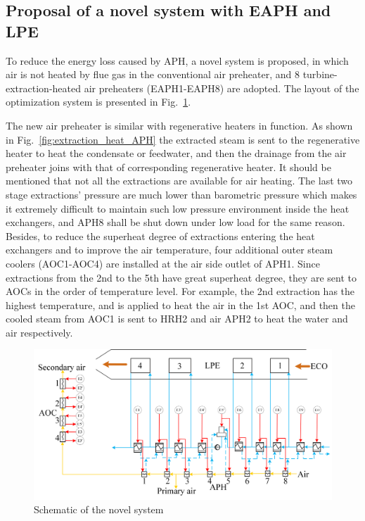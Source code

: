 \documentclass[preprint,12pt]{elsarticle}
\begin{document}
\subsection{Proposal of a novel system with EAPH and LPE}
\label{sub2:prop novel sys}

To reduce the energy loss caused by APH, a novel system is proposed, in which air is not heated by flue gas in the conventional air preheater, and 8 turbine-extraction-heated air preheaters (EAPH1-EAPH8) are adopted.
The  layout of the optimization system is presented in Fig.~\ref{fig:novel_system}.

The new air preheater is similar with regenerative heaters in function.
As shown in Fig.~\ref{fig:extraction_heat_APH} the extracted steam is sent to the regenerative heater to heat the condensate or feedwater, and then the drainage from the air preheater joins with that of corresponding regenerative heater.
It should be mentioned that not all the extractions are available for air heating.
The last two stage extractions' pressure are much lower than barometric pressure which makes it extremely difficult to maintain such low pressure environment inside the heat exchangers, and APH8 shall be shut down under low load for the same reason.
Besides, to reduce the superheat degree of extractions entering the heat exchangers and to improve the air temperature, four additional outer steam coolers (AOC1-AOC4) are installed at the air side outlet of APH1.
Since extractions from the 2nd to the 5th have great superheat degree, they are sent to AOCs in the order of temperature level.
For example, the 2nd extraction has the highest temperature, and is applied to heat the air in the 1st AOC, and then the cooled steam from AOC1 is sent to HRH2 and air APH2 to heat the water and air respectively.  

\begin{figure}[htbp]
\centering
\includegraphics[width=1\textwidth]{fig/novel_system.png}
\caption{Schematic of the novel system} 
\label{fig:novel_system}
\end{figure}
\end{document}
